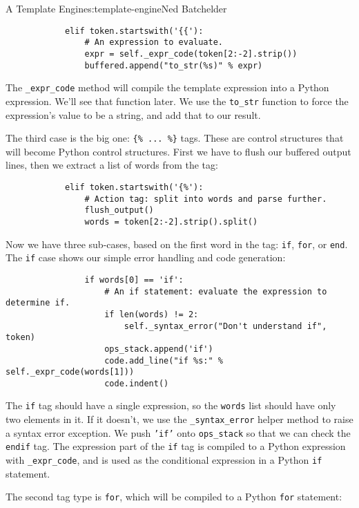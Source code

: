 \begin{aosachapter}{A Template Engine}{s:template-engine}{Ned Batchelder}
\begin{verbatim}
            elif token.startswith('{{'):
                # An expression to evaluate.
                expr = self._expr_code(token[2:-2].strip())
                buffered.append("to_str(%s)" % expr)
\end{verbatim}

The \texttt{\_expr\_code} method will compile the template expression
into a Python expression. We'll see that function later. We use the
\texttt{to\_str} function to force the expression's value to be a
string, and add that to our result.

The third case is the big one: \texttt{\{\% ... \%\}} tags. These are
control structures that will become Python control structures. First we
have to flush our buffered output lines, then we extract a list of words
from the tag:

\begin{verbatim}
            elif token.startswith('{%'):
                # Action tag: split into words and parse further.
                flush_output()
                words = token[2:-2].strip().split()
\end{verbatim}

Now we have three sub-cases, based on the first word in the tag:
\texttt{if}, \texttt{for}, or \texttt{end}. The \texttt{if} case shows
our simple error handling and code generation:

\begin{verbatim}
                if words[0] == 'if':
                    # An if statement: evaluate the expression to determine if.
                    if len(words) != 2:
                        self._syntax_error("Don't understand if", token)
                    ops_stack.append('if')
                    code.add_line("if %s:" % self._expr_code(words[1]))
                    code.indent()
\end{verbatim}

The \texttt{if} tag should have a single expression, so the
\texttt{words} list should have only two elements in it. If it doesn't,
we use the \texttt{\_syntax\_error} helper method to raise a syntax
error exception. We push \texttt{'if'} onto \texttt{ops\_stack} so that
we can check the \texttt{endif} tag. The expression part of the
\texttt{if} tag is compiled to a Python expression with
\texttt{\_expr\_code}, and is used as the conditional expression in a
Python \texttt{if} statement.

The second tag type is \texttt{for}, which will be compiled to a Python
\texttt{for} statement:


\end{aosachapter}
